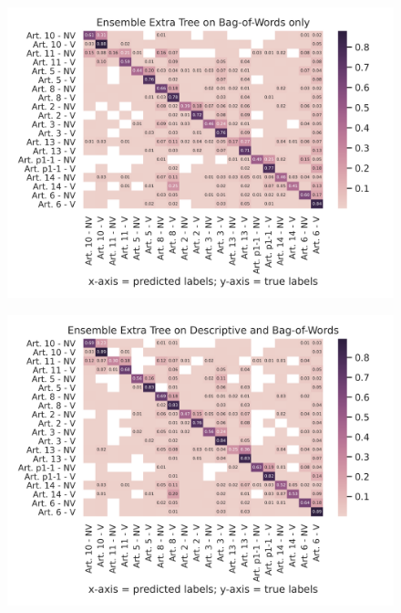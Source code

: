 \documentclass{article}
\begin{document}
\begin{figure}[!htb]
    \centering
    \includegraphics[scale=0.7]{data/analysis/cm/multiclass_cm_test_ensemble_extra_tree_bag-of-words_only.png}  
\end{figure}
\begin{figure}[!htb]
    \centering
    \includegraphics[scale=0.7]{data/analysis/cm/multiclass_cm_test_ensemble_extra_tree_descriptive_and_bag-of-words.png}  
\end{figure}
\end{document}
